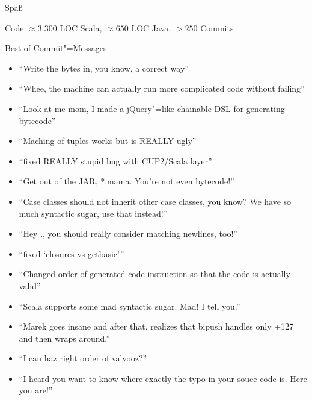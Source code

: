 \documentclass[hyperref={pdfpagelabels=false}]{beamer}
\begin{document}
\begin{frame}{Spaß}
  \begin{block}{Code}
    $\approx 3.300$ LOC Scala, $\approx 650$ LOC Java, $> 250$ Commits
  \end{block}
  \begin{block}{Best of Commit"=Messages}
    \begin{itemize}
      \item \enquote{Write the bytes in, you know, a correct way}
      \item \enquote{Whee, the machine can actually run more complicated code without failing}
      \item \enquote{Look at me mom, I made a jQuery"=like chainable DSL for generating bytecode}
      \item \enquote{Maching of tuples works but is REALLY ugly}
      \item \enquote{fixed REALLY stupid bug with CUP2/Scala layer}
      \item \enquote{Get out of the JAR, *.mama. You're not even bytecode!}
      \item \enquote{Case classes should not inherit other case classes, you know? We have so much syntactic sugar, use that instead!}
      \item \enquote{Hey ., you should really consider matching newlines, too!}
      \item \enquote{fixed \enquote{closures vs getbasic}}
      \item \enquote{Changed order of generated code instruction so that the code is actually valid}
      \item \enquote{Scala supports some mad syntactic sugar. Mad! I tell you.}
      \item \enquote{Marek goes insane and after that, realizes that bipush handles only +127 and then wraps around.}
      \item \enquote{I can haz right order of valyooz?}
      \item \enquote{I heard you want to know where exactly the typo in your souce code is. Here you are!}
    \end{itemize}
  \end{block}
\end{frame}
\end{document}
